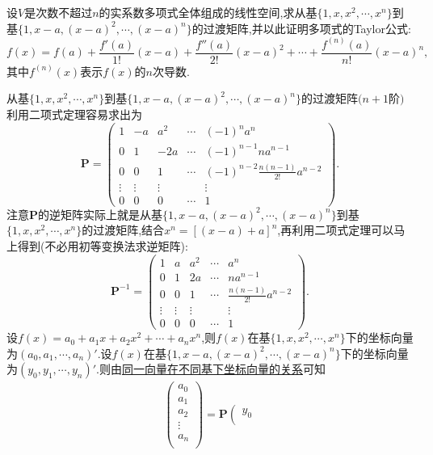 \documentclass[../../main.tex]{subfiles}%
\begin{document}
\begin{example}
设\(V\)是次数不超过\(n\)的实系数多项式全体组成的线性空间,求从基\(\{1,x,x^2,\cdots,x^n\}\)到基\(\{1,x - a,(x - a)^2,\cdots,(x - a)^n\}\)的过渡矩阵,并以此证明多项式的Taylor公式:
\[
f(x)=f(a)+\frac{f'(a)}{1!}(x - a)+\frac{f''(a)}{2!}(x - a)^2+\cdots+\frac{f^{(n)}(a)}{n!}(x - a)^n,
\]
其中\(f^{(n)}(x)\)表示\(f(x)\)的\(n\)次导数.
\end{example}
\begin{solution}

从基\(\{1,x,x^2,\cdots,x^n\}\)到基\(\{1,x - a,(x - a)^2,\cdots,(x - a)^n\}\)的过渡矩阵\((n + 1\)阶\()\)利用二项式定理容易求出为
\[
\boldsymbol{P}=\begin{pmatrix}
1&-a&a^2&\cdots&(-1)^na^n\\
0&1&-2a&\cdots&(-1)^{n - 1}na^{n - 1}\\
0&0&1&\cdots&(-1)^{n - 2}\frac{n(n - 1)}{2!}a^{n - 2}\\
\vdots&\vdots&\vdots&&\vdots\\
0&0&0&\cdots&1
\end{pmatrix}.
\]
注意\(\boldsymbol{P}\)的逆矩阵实际上就是从基\(\{1,x - a,(x - a)^2,\cdots,(x - a)^n\}\)到基\(\{1,x,x^2,\cdots,x^n\}\)的过渡矩阵,结合$x^n=[(x-a)+a]^n$,再利用二项式定理可以马上得到(不必用初等变换法求逆矩阵):
\[
\boldsymbol{P}^{-1}=\begin{pmatrix}
1&a&a^2&\cdots&a^n\\
0&1&2a&\cdots&na^{n - 1}\\
0&0&1&\cdots&\frac{n(n - 1)}{2!}a^{n - 2}\\
\vdots&\vdots&\vdots&&\vdots\\
0&0&0&\cdots&1
\end{pmatrix}.
\]
设\(f(x)=a_0 + a_1x + a_2x^2+\cdots + a_nx^n\),则\(f(x)\)在基\(\{1,x ,x^2,\cdots,x^n\}\)下的坐标向量为$(a_0,a_1,\cdots,a_n)'$.设\(f(x)\)在基\(\{1,x - a,(x - a)^2,\cdots,(x - a)^n\}\)下的坐标向量为$(y_0,y_1,\cdots,y_n)'$.则由\hyperref[theorem:同一向量在不同基下坐标向量的关系]{同一向量在不同基下坐标向量的关系}可知
\begin{align*}
\left( \begin{array}{c}
a_0\\
a_1\\
a_2\\
\vdots\\
a_n\\
\end{array} \right) =\boldsymbol{P}\left( \begin{array}{c}
y_0\\

\end{array}
\end{align*}
\end{solution}
\end{document}
